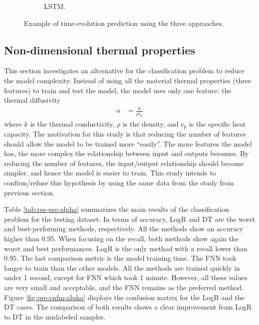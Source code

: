\begin{figure}[htbp!]
\begin{subfigure}[b]{0.49\textwidth}
    \caption{LSTM.}
  \end{subfigure}
  \caption{Example of time-evolution prediction using the three approaches.}
  \label{fig:t-evol}
\end{figure}


\subsection{Non-dimensional thermal properties}

This section investigates an alternative for the classification problem to reduce the model complexity.
Instead of using all the material thermal properties (three features) to train and test the model, the model uses only one feature: the thermal diffusivity
\begin{align}
\alpha &= \frac{k}{\rho c_p}
\end{align}
where $k$ is the thermal conductivity, $\rho$ is the density, and $c_p$ is the specific heat capacity.
The motivation for this study is that reducing the number of features should allow the model to be trained more ``easily''.
The more features the model has, the more complex the relationship between input and outputs becomes.
By reducing the number of features, the input/output relationship should become simpler, and hence the model is easier to train.
This study intends to confirm/refuse this hypothesis by using the same data from the study from previous section.

Table \ref{tab:res-pre-alpha} summarizes the main results of the classification problem for the testing dataset.
In terms of accuracy, LogR and DT are the worst and best-performing methods, respectively.
All the methods show an accuracy higher than 0.95.
When focusing on the recall, both methods show again the worst and best performances.
LogR is the only method with a recall lower than 0.95.
The last comparison metric is the model training time.
The FNN took longer to train than the other models.
All the methods are trained quickly in under 1 second, except for FNN which took 1 minute.
However, all these values are very small and acceptable, and the FNN remains as the preferred method.
Figure \ref{fig:pre-cnfm-alpha} displays the confusion matrix for the LogR and the DT cases.
The comparison of both results shows a clear improvement from LogR to DT in the mislabeled samples.

